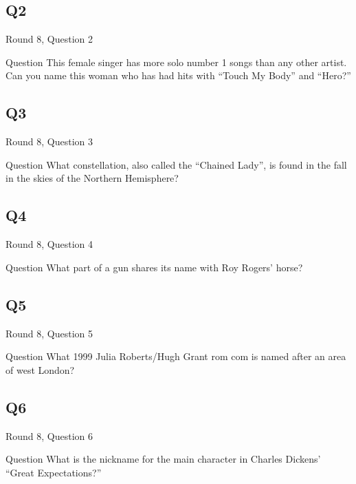 \documentclass[11pt]{beamer}
\begin{document}
\subsection*{Q2}
\begin{frame}[t]{Round 8, Question 2}
\vspace{2em}
\begin{block}{Question}
This female singer has more solo number 1 songs than any other artist. Can you name this woman who has had hits with ``Touch My Body'' and ``Hero?''
\end{block}
\end{frame}
    

\subsection*{Q3}
\begin{frame}[t]{Round 8, Question 3}
\vspace{2em}
\begin{block}{Question}
What constellation, also called the ``Chained Lady'', is found in the fall in the skies of the Northern Hemisphere\@?
\end{block}
\end{frame}
    

\subsection*{Q4}
\begin{frame}[t]{Round 8, Question 4}
\vspace{2em}
\begin{block}{Question}
What part of a gun shares its name with Roy Rogers' horse\@?
\end{block}
\end{frame}
    

\subsection*{Q5}
\begin{frame}[t]{Round 8, Question 5}
\vspace{2em}
\begin{block}{Question}
What 1999 Julia Roberts/Hugh Grant rom com is named after an area of west London\@?
\end{block}
\end{frame}
    

\subsection*{Q6}
\begin{frame}[t]{Round 8, Question 6}
\vspace{2em}
\begin{block}{Question}
What is the nickname for the main character in Charles Dickens' ``Great Expectations?''
\end{block}
\end{frame}
    
\end{document}
